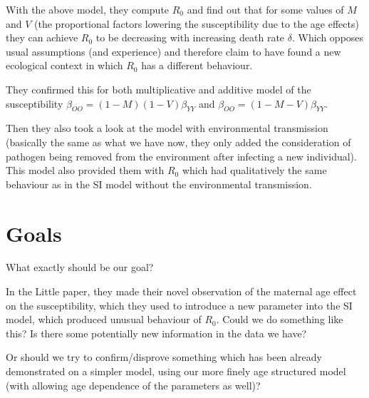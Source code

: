 \documentclass[10pt]{article}         %
\begin{document}
With the above model, they compute $R_0$ and find out that for some values of $M$ and $V$ (the proportional factors lowering the susceptibility due to the age effects) they can achieve $R_0$ to be decreasing with increasing death rate $\delta$. Which opposes usual assumptions (and experience) and therefore claim to have found a new ecological context in which $R_0$ has a different behaviour.\newline

They confirmed this for both multiplicative and additive model of the susceptibility $\beta_{OO}=(1-M)(1-V)\beta_{YY}$ and $\beta_{OO}=(1-M-V)\beta_{YY}$.\newline\newline

Then they also took a look at the model with environmental transmission (basically the same as what we have now, they only added the consideration of pathogen being removed from the environment after infecting a new individual). This model also provided them with $R_0$ which had qualitatively the same behaviour as in the SI model without the environmental transmission.

\section{Goals}

What exactly should be our goal? 

In the Little paper, they made their novel observation of the maternal age effect on the susceptibility, which they used to introduce a new parameter into the SI model, which produced unusual behaviour of $R_0$. Could we do something like this? Is there some potentially new information in the data we have?

Or should we try to confirm/disprove something which has been already demonstrated on a simpler model, using our more finely age structured model (with allowing age dependence of the parameters as well)? 






\end{document}
